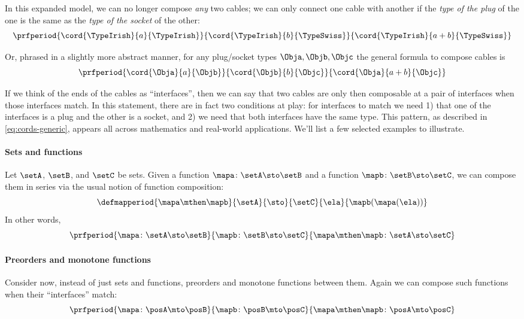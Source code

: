 In this expanded model, we can no longer compose \emph{any} two cables; we can only connect one cable with another   if the  \emph{type of the plug} of the one is the same as the \emph{type of the socket} of the other:
\begin{equation}
    \label{eq:irish-swiss-result}
    \prfperiod{
        \cord{\TypeIrish}{a}{\TypeIrish}
    }{
        \cord{\TypeIrish}{b}{\TypeSwiss}
    }{
        \cord{\TypeIrish}{a + b}{\TypeSwiss}
    }
\end{equation}


Or, phrased in a slightly more abstract manner, for any plug/socket types $\Obja, \Objb, \Objc$ the general formula to compose cables is
%
\begin{equation}
    \label{eq:cords-generic}
    \prfperiod{
        \cord{\Obja}{a}{\Objb}
    }{
        \cord{\Objb}{b}{\Objc}
    }{
        \cord{\Obja}{a+b}{\Objc}
    }
\end{equation}
 
If we think of the ends of the cables as ``interfaces'', then we can say that two cables are only then composable at a pair of interfaces when those interfaces match. In this statement, there are in fact two conditions at play: for interfaces to match we need 1) that one of the interfaces is a plug and the other is a socket, and 2) we need that both interfaces have the same type. This pattern, as described in \cref{eq:cords-generic}, appears all across mathematics and real-world applications. We'll list a few selected examples to illustrate. 

\paragraph{Sets and functions}
Let $\setA$, $\setB$, and $\setC$ be sets. Given a function $\mapa \colon \setA \sto \setB$ and a function $\mapb \colon \setB \sto \setC$, we can compose them in series via the usual notion of function composition: 
\begin{equation}
\defmapperiod{
\mapa \mthen \mapb
}{ \setA
}{ \sto
}{ \setC
}{ \ela
}{ \mapb(\mapa(\ela))
}
\end{equation}
In other words, 
\begin{equation}
    \label{eq:interfaces-sets}
    \prfperiod{
        \mapa \colon \setA \sto \setB
    }{
        \mapb \colon \setB \sto \setC
    }{
        \mapa \mthen \mapb \colon \setA \sto \setC
    }
\end{equation}

\paragraph{Preorders and monotone functions} Consider now, instead of just sets and functions, preorders and monotone functions between them. Again we can compose such functions when their ``interfaces'' match:
\begin{equation}
    \label{eq:interfaces-preorders}
    \prfperiod{
        \mapa \colon \posA \mto \posB
    }{
        \mapb \colon \posB \mto \posC
    }{
        \mapa \mthen \mapb \colon \posA \mto \posC
    }
\end{equation}

